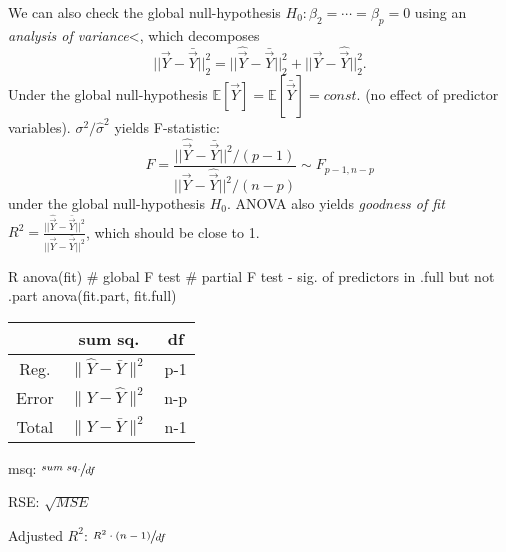 \begin{sectionbox}\nospacing{}
  We can also check the global null-hypothesis $H_{0}: \beta_{2} = \cdots = \beta_{p} = 0$ using an \emph{analysis of variance}<, which decomposes
  \[||\vec{Y} - \bar{\vec{Y}}||^{2}_{2} = ||\hat{\vec{Y}} - \bar{\vec{Y}}||^{2}_{2} + ||\vec{Y} - \hat{\vec{Y}}||^{2}_{2}.\]
  Under the global null-hypothesis $\mathbb{E}[\vec{Y}] = \mathbb{E}[\bar{\vec{Y}}] = const$. (no effect of predictor variables). $\sigma^{2}/ \hat \sigma^{2}$ yields F-statistic:
  \[F = \frac{||\hat{\vec{Y}} - \bar{\vec{Y}}||^{2}/(p-1)}{||\vec{Y} - \hat{\vec{Y}}||^{2} / (n-p)} \sim F_{p-1,n-p}\] under the global null-hypothesis $H_{0}$.
  ANOVA also yields \emph{goodness of fit} $R^{2} = \frac{||\hat{\vec{Y}} - \bar{\vec{Y}}||^{2}}{||\vec{Y} - \bar{\vec{Y}}||^{2}}$, which should be close to 1.
\begin{mintlinebox}{R}
  anova(fit) # global F test
  # partial F test - sig. of predictors in .full but not .part
  anova(fit.part, fit.full)
\end{mintlinebox}
\end{sectionbox}
\begin{notebox}\nospacing{}
    \begin{multicols}{2}
        \begin{center}
            \begin{tabular}{ c | c c}
             & sum sq. & df \\
             \hline
             Reg. & $\lVert \hat{Y} -  \bar{Y} \rVert^2$ & p-1  \\ 
             Error & $\lVert Y -  \hat{Y} \rVert^2$ & n-p \\
             \hline
             Total & $\lVert Y -  \bar{Y} \rVert^2$ & n-1    
            \end{tabular}
        \end{center}
    \columnbreak
      \begin{enumeratenosep}[label=\roman*]
        \item msq: $\sfrac{sum\ sq.}{df}$
        \item RSE: $\sqrt{MSE}$
        \item Adjusted $R^2$: $\sfrac{R^2\cdot (n-1)}{df}$
      \end{enumeratenosep}
    \end{multicols}
\end{notebox}

